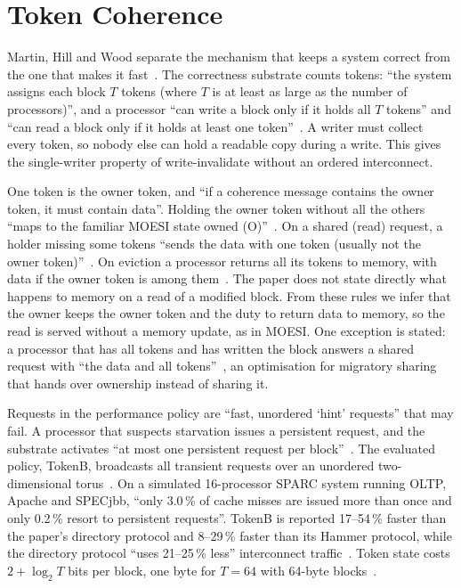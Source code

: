 \section{Token Coherence}
\label{sec:scal-token}
%

Martin, Hill and Wood separate the mechanism that keeps a system correct from the
one that makes it fast~\cite{martin2003token}. The correctness substrate counts
tokens: ``the system assigns each block $T$ tokens (where $T$
is at least as large as the number of processors)'', and a processor ``can write a
block only if it holds all $T$ tokens'' and ``can read a block only if it holds at
least one token''~\cite[\S3.1]{martin2003token}. A writer must collect every token,
so nobody else can hold a readable copy during a write. This gives the
single-writer property of write-invalidate without an ordered interconnect.

One token is the owner token, and ``if a coherence message contains the owner
token, it must contain data''. Holding the owner token without all the others
``maps to the familiar MOESI state owned (O)''~\cite[\S3.1]{martin2003token}. On a
shared (read) request, a holder missing some tokens ``sends the data with one token
(usually not the owner token)''~\cite[\S4.2]{martin2003token}. On eviction a
processor returns all its tokens to memory, with data if the owner token is among
them~\cite[\S3.1]{martin2003token}. The paper does not state directly what happens
to memory on a read of a modified block. From these rules we infer that the owner
keeps the owner token and the duty to return data to memory, so the read is served
without a memory update, as in MOESI. One exception is stated: a processor that has
all tokens and has written the block answers a shared request with ``the data and
all tokens''~\cite[\S4.2]{martin2003token}, an optimisation for migratory sharing
that hands over ownership instead of sharing it.

Requests in the performance policy are ``fast, unordered `hint' requests'' that may
fail. A processor that suspects starvation issues a persistent request, and the
substrate activates ``at most one persistent request per
block''~\cite[\S3.2, \S4.1]{martin2003token}. The evaluated policy, TokenB,
broadcasts all transient requests over an unordered two-dimensional
torus~\cite[\S4.2, \S5.2]{martin2003token}. On a simulated 16-processor SPARC system
running OLTP, Apache and SPECjbb, ``only 3.0\,\% of cache misses are issued more
than once and only 0.2\,\% resort to persistent requests''. TokenB is reported
17--54\,\% faster than the paper's directory protocol and 8--29\,\% faster than its
Hammer protocol, while the directory protocol ``uses 21--25\,\% less'' interconnect
traffic~\cite[\S6]{martin2003token}. Token state costs $2+\log_2 T$ bits per block,
one byte for $T=64$ with 64-byte blocks~\cite[\S3.1]{martin2003token}.

